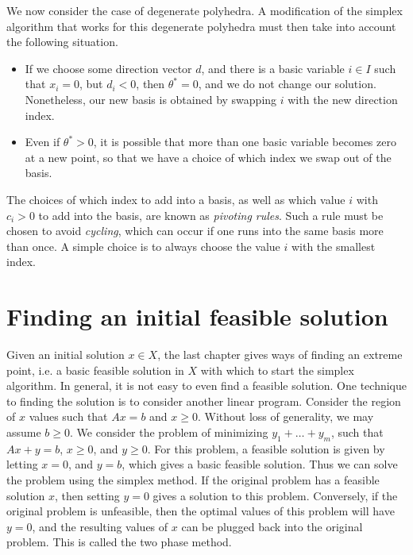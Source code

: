 We now consider the case of degenerate polyhedra. A modification of the simplex algorithm that works for this degenerate polyhedra must then take into account the following situation.
%
\begin{itemize}
    \item If we choose some direction vector $d$, and there is a basic variable $i \in I$ such that $x_i = 0$, but $d_i < 0$, then $\theta^* = 0$, and we do not change our solution. Nonetheless, our new basis is obtained by swapping $i$ with the new direction index.

    \item Even if $\theta^* > 0$, it is possible that more than one basic variable becomes zero at a new point, so that we have a choice of which index we swap out of the basis.
\end{itemize}
%
The choices of which index to add into a basis, as well as which value $i$ with $c_i > 0$ to add into the basis, are known as \emph{pivoting rules}. Such a rule must be chosen to avoid \emph{cycling}, which can occur if one runs into the same basis more than once. A simple choice is to always choose the value $i$ with the smallest index.

\section{Finding an initial feasible solution}

Given an initial solution $x \in X$, the last chapter gives ways of finding an extreme point, i.e. a basic feasible solution in $X$ with which to start the simplex algorithm. In general, it is not easy to even find a feasible solution. One technique to finding the solution is to consider another linear program. Consider the region of $x$ values such that $Ax = b$ and $x \geq 0$. Without loss of generality, we may assume $b \geq 0$. We consider the problem of minimizing $y_1 + \dots + y_m$, such that $Ax + y = b$, $x \geq 0$, and $y \geq 0$. For this problem, a feasible solution is given by letting $x = 0$, and $y = b$, which gives a basic feasible solution. Thus we can solve the problem using the simplex method. If the original problem has a feasible solution $x$, then setting $y = 0$ gives a solution to this problem. Conversely, if the original problem is unfeasible, then the optimal values of this problem will have $y = 0$, and the resulting values of $x$ can be plugged back into the original problem. This is called the two phase method.






